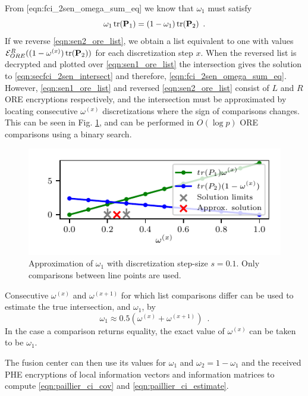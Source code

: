 From [eqn:fci\_2sen\_omega\_sum\_eq] we know that $\omega_1$ must satisfy
\begin{equation}
    \omega_1 \operatorname{tr}({{\mathbf{P}}}_1) = (1-\omega_1)\operatorname{tr}({{\mathbf{P}}}_2)\enspace. \label{eqn:secfci_2sen_intersect}
\end{equation}
If we reverse \eqref{eqn:sen2_ore_list}, we obtain a list equivalent to one with values $\mathcal{E}^R_{ORE}((1-\omega^{(x)})\operatorname{tr}({{\mathbf{P}}}_2))$ for each discretization step $x$. When the reversed list is decrypted and plotted over \eqref{eqn:sen1_ore_list} the intersection gives the solution to \eqref{eqn:secfci_2sen_intersect} and therefore, \eqref{eqn:fci_2sen_omega_sum_eq}. However, \eqref{eqn:sen1_ore_list} and reversed \eqref{eqn:sen2_ore_list} consist of $L$ and $R$ ORE encryptions respectively, and the intersection must be approximated by locating consecutive $\omega^{(x)}$ discretizations where the sign of comparisons changes. This can be seen in Fig. \ref{fig:2_sensor_sol}, and can be performed in $O(\log{p})$ ORE comparisons using a binary search.
\begin{figure}[tb]
   \begin{center}
      \includegraphics{figures/2_sensors.pdf}
   \end{center}
   \caption{Approximation of $\omega_1$ with discretization step-size $s=0.1$. Only comparisons between line points are used.}
   \label{fig:2_sensor_sol}
\end{figure}
Consecutive $\omega^{(x)}$ and $\omega^{(x+1)}$ for which list comparisons differ can be used to estimate the true intersection, and $\omega_1$, by
\begin{equation}
   \omega_1 \approx 0.5(\omega^{(x)} + \omega^{(x+1)})\enspace. \label{eqn:secfci_2sen_omega}
\end{equation}
In the case a comparison returns equality, the exact value of $\omega^{(x)}$ can be taken to be $\omega_1$.

The fusion center can then use its values for $\omega_1$ and $\omega_2 = 1-\omega_1$ and the received PHE encryptions of local information vectors and information matrices to compute \eqref{eqn:paillier_ci_cov} and \eqref{eqn:paillier_ci_estimate}.

